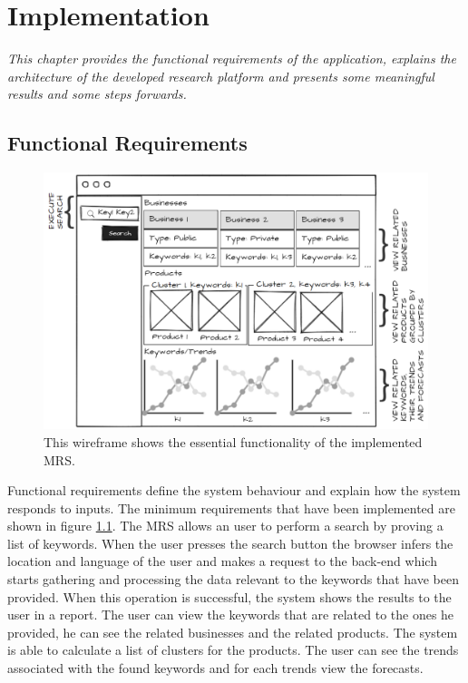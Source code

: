 \chapter{Implementation}

\textsl{This chapter provides the functional requirements of the application, explains the architecture of the developed research platform and presents some meaningful results and some steps forwards.}

\section{Functional Requirements}

\begin{figure}[h!]
	\centering
	\includegraphics[scale=0.68]{img/wireframe.png}
	\caption{This wireframe shows the essential functionality of the implemented MRS.}
	\label{Implementation:Wireframe}
\end{figure}

\newpage
Functional requirements define the system behaviour and explain how the system responds to inputs. The minimum requirements that have been implemented are shown in figure \ref{Implementation:Wireframe}. The \ac{MRS} allows an user to perform a search by proving a list of keywords. When the user presses the search button the browser infers the location and language of the user and makes a request to the back-end which starts gathering and processing the data relevant to the keywords that have been provided. When this operation is successful, the system shows the results to the user in a report. The user can view the keywords that are related to the ones he provided, he can see the related businesses and the related products. The system is able to calculate a list of clusters for the products. The user can see the trends associated with the found keywords and for each trends view the forecasts. 

